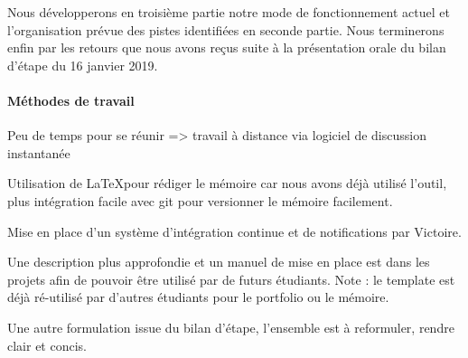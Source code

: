 Nous développerons en troisième partie notre mode de fonctionnement actuel et l’organisation prévue des pistes identifiées en seconde partie.
Nous terminerons enfin par les retours que nous avons reçus suite à la présentation orale du bilan d’étape du 16 janvier 2019.

\paragraph{Méthodes de travail}

Peu de temps pour se réunir => travail à distance via logiciel de discussion instantanée

Utilisation de \LaTeX pour rédiger le mémoire car nous avons déjà utilisé l'outil,
plus intégration facile avec git pour versionner le mémoire facilement.

Mise en place d'un système d'intégration continue et de notifications par Victoire.

Une description plus approfondie et un manuel de mise en place est dans les projets
afin de pouvoir être utilisé par de futurs étudiants. Note : le template est déjà ré-utilisé par d'autres étudiants pour le portfolio ou le mémoire.

{\color{red}Une autre formulation issue du bilan d'étape, l'ensemble est à reformuler, rendre clair et concis.}


